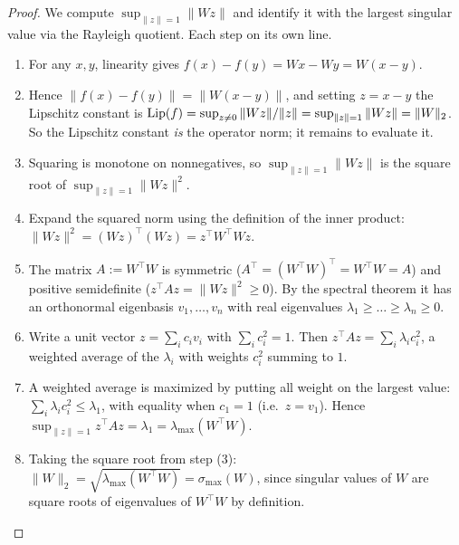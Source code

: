 \begin{proof}
We compute $\sup_{\|z\|=1}\|Wz\|$ and identify it with the largest singular value via the Rayleigh quotient. Each step on its own line.
\begin{enumerate}[label=(\arabic*),nosep]
  \item For any $x,y$, linearity gives $f(x)-f(y)=Wx-Wy=W(x-y)$.
  \item Hence $\|f(x)-f(y)\| = \|W(x-y)\|$, and setting $z=x-y$ the Lipschitz constant is $\operatorname{Lip}(f)=\sup_{z\neq0}\|Wz\|/\|z\| = \sup_{\|z\|=1}\|Wz\|=\|W\|_2$. So the Lipschitz constant \emph{is} the operator norm; it remains to evaluate it.
  \item Squaring is monotone on nonnegatives, so $\sup_{\|z\|=1}\|Wz\|$ is the square root of $\sup_{\|z\|=1}\|Wz\|^2$.
  \item Expand the squared norm using the definition of the inner product: $\|Wz\|^2 = (Wz)^\top(Wz) = z^\top W^\top W z$.
  \item The matrix $A:=W^\top W$ is symmetric ($A^\top=(W^\top W)^\top = W^\top W = A$) and positive semidefinite ($z^\top A z = \|Wz\|^2\ge0$). By the spectral theorem it has an orthonormal eigenbasis $v_1,\dots,v_n$ with real eigenvalues $\lambda_1\ge\dots\ge\lambda_n\ge0$.
  \item Write a unit vector $z=\sum_i c_i v_i$ with $\sum_i c_i^2=1$. Then $z^\top A z = \sum_i \lambda_i c_i^2$, a weighted average of the $\lambda_i$ with weights $c_i^2$ summing to $1$.
  \item A weighted average is maximized by putting all weight on the largest value: $\sum_i \lambda_i c_i^2 \le \lambda_1$, with equality when $c_1=1$ (i.e.\ $z=v_1$). Hence $\sup_{\|z\|=1} z^\top A z = \lambda_1 = \lambda_{\max}(W^\top W)$.
  \item Taking the square root from step (3): $\|W\|_2 = \sqrt{\lambda_{\max}(W^\top W)} = \sigma_{\max}(W)$, since singular values of $W$ are square roots of eigenvalues of $W^\top W$ by definition.
\end{enumerate}
\end{proof}

